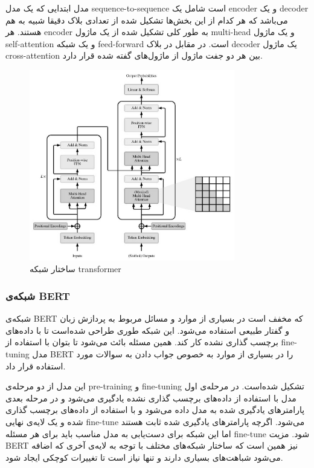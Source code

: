 \documentclass[12pt, a4paper, oneside]{report}
\begin{document}
مدل ابتدایی که یک مدل
sequence-to-sequence
است شامل یک
encoder
و یک
decoder
می‌باشد که هر کدام از این بخش‌ها تشکیل شده از تعدادی بلاک دقیقا شبیه به هم هستند. هر
encoder
به طور کلی تشکیل شده از یک ماژول
multi-head
و یک ماژول
self-attention
و یک شبکه 
feed-forward
است. در مقابل در بلاک
decoder
یک ماژول
cross-attention
بین هر دو جفت ماژول از ماژول‌های گفته شده قرار دارد.\cite{lin2021survey}

\begin{figure}[!ht]
    \centering
    \includegraphics[width=0.8\textwidth]{transformer}
    \caption{ ساختار شبکه transformer }
    \label{fig:transformer}
\end{figure}

\subsubsection{شبکه‌ی BERT}

شبکه‌ی
BERT
که مخفف
است در بسیاری از موارد و مسائل مربوط به پردازش زبان و گفتار طبیعی استفاده می‌شود.
این شبکه طوری طراحی شده‌است تا با داده‌های برچسب گذاری نشده کار کند. همین مسئله بائث می‌شود تا بتوان با استفاده از
fine-tuning
مدل
BERT
را در بسیاری از موارد به خصوص جواب دادن به سوالات مورد استفاده قرار داد. 

این مدل از دو مرحله‌ی
pre-training
و
fine-tuning
تشکیل شده‌است. در مرحله‌ی اول مدل با استفاده از داده‌های برچسب گذاری نشده یادگیری می‌شود و در مرحله بعدی پارامتر‌های
یادگیری شده به مدل داده می‌شود و با استفاده از داده‌های برچسب گذاری شده و یک لایه‌ی نهایی
fine-tune
می‌شود. اگرچه پارامتر‌های یادگیری شده ثابت هستند اما این شبکه برای دست‌یابی به مدل مناسب باید برای هر مسئله
fine-tune
شود. مزیت
BERT
نیز همین است که ساختار شبکه‌های مختلف با توجه به لایه‌ی آخری که اضافه می‌شود شباهت‌های بسیاری دارند و تنها نیاز است
تا تغییرات کوچکی ایجاد شود.
\end{document}
